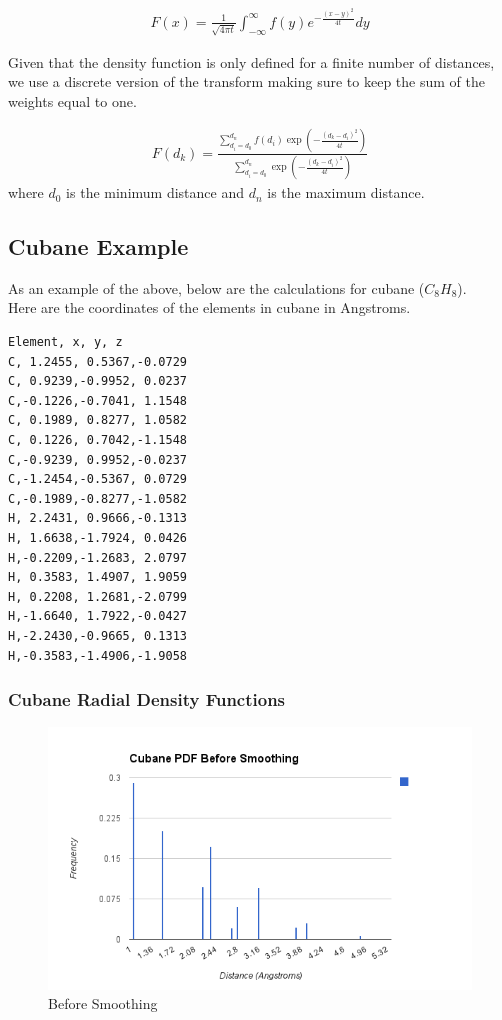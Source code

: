 \documentclass[12pt,letterpaper]{article}
\begin{document}
\begin{align*}
F(x)=\frac{1}{\sqrt{4\pi t}} 
  \int_{-\infty}^\infty f(y) e^{-\frac{(x-y)^2}{4t}} dy
\end{align*}

Given that the density function is only defined for a finite number of
distances, we use a discrete version of the transform making sure to keep the
sum of the weights equal to one.

\begin{align*}
  F(d_k) = \frac{\sum_{d_i = d_0}^{d_n} f(d_i) \exp\left(-\frac{(d_k -
                  d_i)^2}{4t}\right)}
            {\sum_{d_i = d_0}^{d_n} \exp\left(-\frac{(d_k - d_i)^2}{4t}\right)}
\end{align*}
where $d_0$ is the minimum distance and $d_n$ is the maximum distance.

\subsection{Cubane Example}
As an example of the above, below are the calculations for cubane ($C_8 H_8$).\\

\noindent Here are the coordinates of the elements in cubane in Angstroms.

\begin{verbatim}
Element, x, y, z
C, 1.2455, 0.5367,-0.0729
C, 0.9239,-0.9952, 0.0237
C,-0.1226,-0.7041, 1.1548
C, 0.1989, 0.8277, 1.0582
C, 0.1226, 0.7042,-1.1548
C,-0.9239, 0.9952,-0.0237
C,-1.2454,-0.5367, 0.0729
C,-0.1989,-0.8277,-1.0582
H, 2.2431, 0.9666,-0.1313
H, 1.6638,-1.7924, 0.0426
H,-0.2209,-1.2683, 2.0797
H, 0.3583, 1.4907, 1.9059
H, 0.2208, 1.2681,-2.0799
H,-1.6640, 1.7922,-0.0427
H,-2.2430,-0.9665, 0.1313
H,-0.3583,-1.4906,-1.9058
\end{verbatim}

\subsubsection{Cubane Radial Density Functions}
\begin{figure}[h!]
  \begin{center}
    \includegraphics[scale=0.7]{figs/cubane_rdf_before_smoothing.png}
    \caption{Before Smoothing}
  \end{center}
\end{figure}
\end{document}
